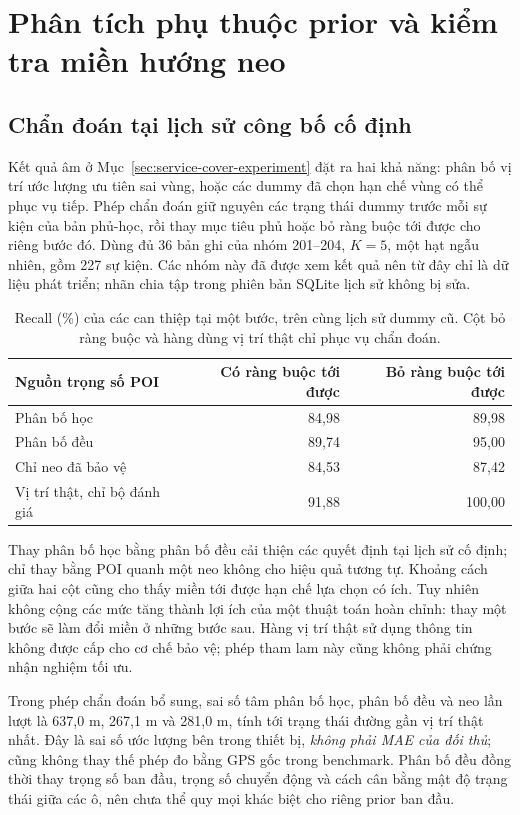 \begingroup
{}
\section{Phân tích phụ thuộc prior và kiểm tra miền hướng neo}
\label{sec:recovery-experiment}

\subsection{Chẩn đoán tại lịch sử công bố cố định}

Kết quả âm ở Mục~\ref{sec:service-cover-experiment} đặt ra hai khả năng: phân bố vị trí ước lượng ưu tiên sai vùng, hoặc các dummy đã chọn hạn chế vùng có thể phục vụ tiếp. Phép chẩn đoán giữ nguyên các trạng thái dummy trước mỗi sự kiện của bản phủ-học, rồi thay mục tiêu phủ hoặc bỏ ràng buộc tới được cho riêng bước đó. Dùng đủ 36 bản ghi của nhóm 201--204, $K=5$, một hạt ngẫu nhiên, gồm 227 sự kiện. Các nhóm này đã được xem kết quả nên từ đây chỉ là dữ liệu phát triển; nhãn chia tập trong phiên bản SQLite lịch sử không bị sửa.

\begin{table}[htbp]
\centering\small
\caption{Recall (\%) của các can thiệp tại một bước, trên cùng lịch sử dummy cũ. Cột bỏ ràng buộc và hàng dùng vị trí thật chỉ phục vụ chẩn đoán.}
\label{tab:recovery-diagnostic}
\begin{tabular}{lrr}
\toprule
Nguồn trọng số POI & Có ràng buộc tới được & Bỏ ràng buộc tới được\\
\midrule
Phân bố học & 84,98 & 89,98\\
Phân bố đều & 89,74 & 95,00\\
Chỉ neo đã bảo vệ & 84,53 & 87,42\\
Vị trí thật, chỉ bộ đánh giá & 91,88 & 100,00\\
\bottomrule
\end{tabular}
\end{table}

Thay phân bố học bằng phân bố đều cải thiện các quyết định tại lịch sử cố định; chỉ thay bằng POI quanh một neo không cho hiệu quả tương tự. Khoảng cách giữa hai cột cũng cho thấy miền tới được hạn chế lựa chọn có ích. Tuy nhiên không cộng các mức tăng thành lợi ích của một thuật toán hoàn chỉnh: thay một bước sẽ làm đổi miền ở những bước sau. Hàng vị trí thật sử dụng thông tin không được cấp cho cơ chế bảo vệ; phép tham lam này cũng không phải chứng nhận nghiệm tối ưu.

Trong phép chẩn đoán bổ sung, sai số tâm phân bố học, phân bố đều và neo lần lượt là 637,0 m, 267,1 m và 281,0 m, tính tới trạng thái đường gần vị trí thật nhất. Đây là sai số ước lượng bên trong thiết bị, \emph{không phải MAE của đối thủ}; cũng không thay thế phép đo bằng GPS gốc trong benchmark. Phân bố đều đồng thời thay trọng số ban đầu, trọng số chuyển động và cách cân bằng mật độ trạng thái giữa các ô, nên chưa thể quy mọi khác biệt cho riêng prior ban đầu.


